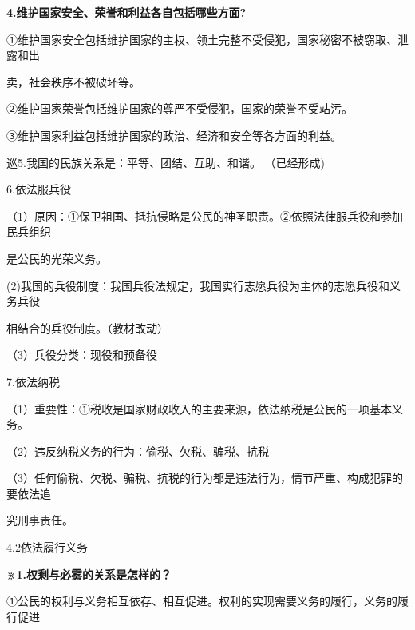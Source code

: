 \documentclass[lang=cn,11pt]{elegantbook}
\newcommand{\daofasym}[1]{{\daofasymbolfont #1}}
\newcommand{\daofasym}[1]{#1}
\begin{document}
\textbf{4.维护国家安全、荣誉和利益各自包括哪些方面?}\par

\daofasym{①}维护国家安全包括维护国家的主权、领土完整不受侵犯，国家秘密不被窃取、泄露和出\par

卖，社会秩序不被破坏等。\par

\daofasym{②}维护国家荣誉包括维护国家的尊严不受侵犯，国家的荣誉不受站污。\par

\daofasym{③}维护国家利益包括维护国家的政治、经济和安全等各方面的利益。\par

巡5.我国的民族关系是：平等、团结、互助、和谐。 （已经形成)\par

6.依法服兵役\par

（1）原因：\daofasym{①}保卫祖国、抵抗侵略是公民的神圣职责。\daofasym{②}依照法律服兵役和参加民兵组织\par

是公民的光荣义务。\par

(2)我国的兵役制度：我国兵役法规定，我国实行志愿兵役为主体的志愿兵役和义务兵役\par

相结合的兵役制度。（教材改动）\par

（3）兵役分类：现役和预备役\par

7.依法纳税\par

（1）重要性：\daofasym{①}税收是国家财政收入的主要来源，依法纳税是公民的一项基本义务。\par

（2）违反纳税义务的行为：偷税、欠税、骗税、抗税\par

（3）任何偷税、欠税、骗税、抗税的行为都是违法行为，情节严重、构成犯罪的要依法追\par

究刑事责任。\par

4.2依法履行义务\par

\textbf{※1.权剩与必雾的关系是怎样的？}\par

\daofasym{①}公民的权利与义务相互依存、相互促进。权利的实现需要义务的履行，义务的履行促进\par
\end{document}
